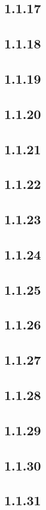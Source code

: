 \documentclass[11pt]{article}
\begin{document}
	\subsection*{1.1.17}
	\subsection*{1.1.18}
	\subsection*{1.1.19}
	\subsection*{1.1.20}
	\subsection*{1.1.21}
	\subsection*{1.1.22}
	\subsection*{1.1.23}
	\subsection*{1.1.24}
	\subsection*{1.1.25}
	\subsection*{1.1.26}
	\subsection*{1.1.27}
	\subsection*{1.1.28}
	\subsection*{1.1.29}
	\subsection*{1.1.30}
	\subsection*{1.1.31}
\end{document}
